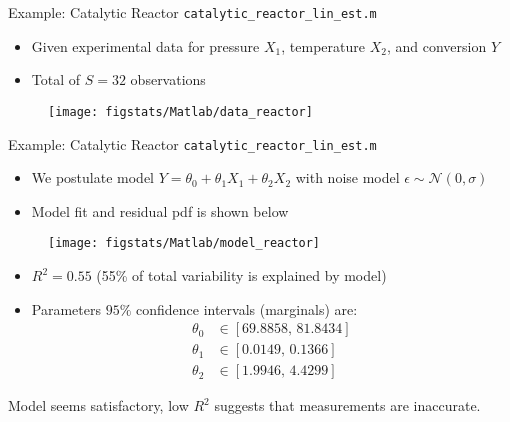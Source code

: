 \documentclass[handout,9pt]{beamer}
\begin{document}
%
\begin{frame}{Example: Catalytic Reactor \footnotesize{\texttt{catalytic\_reactor\_lin\_est.m}}}

\begin{block}{}
\begin{itemize}
\setlength{\itemsep}{5pt}
\item Given experimental data for pressure $X_1$, temperature $X_2$, and conversion $Y$ 
\item Total of $S=32$ observations
\end{itemize}
\end{block}


\begin{figure}[!htb]
    \centering
	\texttt{[image: figstats/Matlab/data\_reactor]}
\end{figure}

\end{frame}

%
\begin{frame}{Example: Catalytic Reactor \footnotesize{\texttt{catalytic\_reactor\_lin\_est.m}}}

\begin{block}{}
\begin{itemize}
\item We postulate model $Y=\theta_0+\theta_1X_1 + \theta_2 X_2$ with noise model $\epsilon \sim \mathcal{N}(0,\sigma)$
\item Model fit and residual pdf is shown below 
\end{itemize}
\end{block}


\begin{figure}[!htb]
    \centering
	\texttt{[image: figstats/Matlab/model\_reactor]}
\end{figure}

\begin{itemize}
\item $R^2=0.55$ (55\% of total variability is explained by model)
\item Parameters $95\%$ confidence intervals (marginals) are:
\begin{align*}
 \theta_0&\in [69.8858, \,81.8434]\\ 
 \theta_1&\in  [0.0149,\,    0.1366]\\
  \theta_2&\in [1.9946,\,   4.4299]
\end{align*}
\end{itemize}
\begin{block}{}
\begin{center}
Model seems satisfactory, low $R^2$ suggests that measurements are inaccurate. 
\end{center}
\end{block}

\end{frame}
\end{document}
